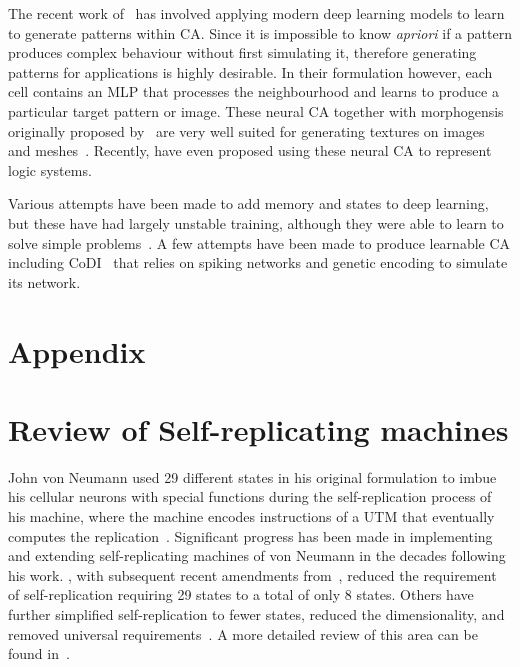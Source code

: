 \documentclass[11pt]{article}
\begin{document}
The recent work of~\citet{mordvintsev_growing_2020} has involved applying modern deep learning models to learn to generate patterns within \ac{CA}. Since it is impossible to know \emph{apriori} if a pattern produces complex behaviour without first simulating it, therefore generating patterns for applications is highly desirable. In their formulation however, each cell contains an \ac{MLP} that processes the neighbourhood and learns to produce a particular target pattern or image. These neural \ac{CA} together with morphogensis originally proposed by~\citet{turing_chemical_1990} are very well suited for generating textures on images~\citep{mordvintsev_nca_2021} and meshes~\citep{pajouheshgar_mesh_2024}. Recently, \citet{miotti_differentiable_2025} have even proposed using these neural \ac{CA} to represent logic systems.

Various attempts have been made to add memory and states to deep learning, but these have had largely unstable training, although they were able to learn to solve simple problems~\citep{graves_neural_2014, graves_hybrid_2016}. A few attempts have been made to produce learnable \ac{CA} including CoDI~\citep{gers_codi-1bit_1998} that relies on spiking networks and genetic encoding to simulate its network.

\section*{Appendix}
\appendix
\section{Review of Self-replicating machines}\label{sec::review-replication}
John von Neumann used 29 different states in his original formulation to imbue his cellular neurons with special functions during the self-replication process of his machine, where the machine encodes instructions of a \ac{UTM} that eventually computes the replication~\citep{von_neumann_theory_1966}. Significant progress has been made in implementing~\citep{mange_macroscopic_2004,buckley_signal_2008} and extending self-replicating machines of von Neumann in the decades following his work. \citet{codd_cellular_1968}, with subsequent recent amendments from~\citet{hutton_codds_2010}, reduced the requirement of self-replication requiring 29 states to a total of only 8 states. Others have further simplified self-replication to fewer states, reduced the dimensionality, and removed universal requirements~\citep{banks_information_1971,wolfram_statistical_1983,langton_self-reproduction_1984}. A more detailed review of this area can be found in~\citet{sipper_fifty_1998}.
\end{document}
